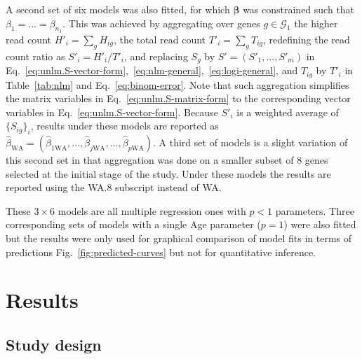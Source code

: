 \documentclass[letterpaper]{article}
\begin{document}
A second set of six models was also
fitted, for which \(\boldsymbol{\beta}\) was constrained such that \(\beta_1 =
... = \beta_{n_1}\).  This was achieved by aggregating over genes
\(g\in\mathcal{G}_1\) the higher read count \(H'_i = \sum_g H_{ig}\), the
total read count \(T'_i = \sum_g T_{ig}\), redefining the read count ratio
as \(S'_i = H'_i / T'_i\), and replacing \(S_g\) by \(S'=(S'_1,...,S'_m)\) in
Eq.~\ref{eq:unlm.S-vector-form},~\ref{eq:nlm-general},~\ref{eq:logi-general}, and \(T_{ig}\) by \(T'_i\) in
Table~\ref{tab:nlm} and Eq.~\ref{eq:binom-error}.  Note that such aggregation
simplifies the matrix variables in Eq.~\ref{eq:unlm.S-matrix-form} to the
corresponding vector variables in Eq.~\ref{eq:unlm.S-vector-form}.  Because \(S'_i\) is a
weighted average of \(\{S_{ig}\}_i\), results under these models are reported
as \(\hat{\beta}_\mathrm{WA} =
(\hat{\beta}_{1\mathrm{WA}},...,\hat{\beta}_{j\mathrm{WA}},...,\hat{\beta}_{p\mathrm{WA}})\).  A
third set of models is a slight variation of this second set in that
aggregation was done on a smaller subset of 8 genes selected at the initial
stage of the study.  Under these models the results are reported using the
WA.8 subscript instead of WA.

These \(3\times 6\) models are all multiple regression ones with \(p<1\)
parameters.  Three corresponding sets of models with a single Age parameter
(\(p=1\)) were also fitted but the results were only used for graphical
comparison of model fits in terms of predictions
Fig.~\ref{fig:predicted-curves} but not for quantitative inference.

\section{Results}

\subsection{Study design}
\end{document}

